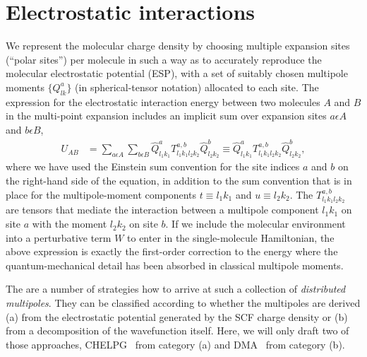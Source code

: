 \section{Electrostatic interactions}
\label{sec:distributed_multipoles}

We represent the molecular charge density by choosing multiple expansion sites (``polar sites'') per molecule in such a way as to accurately reproduce the molecular electrostatic potential (ESP), with a set of suitably chosen multipole moments $\{Q_{lk}^a\}$ (in spherical-tensor notation) allocated to each site. The expression for the electrostatic interaction energy between two molecules $A$ and $B$ in the multi-point expansion includes an implicit sum over expansion sites $a\epsilon A$ and $b\epsilon B$,
\begin{align}
 U_{AB} & = \sum_{a\epsilon A} \sum_{b\epsilon B} \hat{Q}_{l_1k_1}^a T_{l_1k_1l_2k_2}^{a,b} \hat{Q}_{l_2k_2}^b \equiv  \hat{Q}_{l_1k_1}^a T_{l_1k_1l_2k_2}^{a,b} \hat{Q}_{l_2k_2}^b,
 \label{equ:mol_distributed_U}
\end{align}
where we have used the Einstein sum convention for the site indices $a$ and $b$ on the right-hand side of the equation, in addition to the sum convention that is in place for the multipole-moment components $t\equiv l_1 k_1$ and $u\equiv l_2 k_2$. The $T_{l_1k_1l_2k_2}^{a,b}$ are tensors that mediate the interaction between a multipole component $l_1 k_1$ on site $a$ with the moment $l_2 k_2$ on site $b$. If we include the molecular environment into a perturbative term $W$ to enter in the single-molecule Hamiltonian, the above expression is exactly the first-order correction to the energy where the quantum-mechanical detail has been absorbed in classical multipole moments.

The are a number of strategies how to arrive at such a collection of {\em distributed multipoles}. They can be classified according to whether the multipoles are derived (a) from the electrostatic potential generated by the SCF charge density or (b) from a decomposition of the wavefunction itself. Here, we will only draft two of those approaches, CHELPG~\cite{breneman_determining_1990} from category (a) and DMA~\cite{stone_distributed_1985} from category (b).

